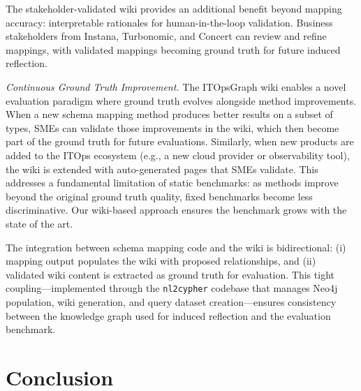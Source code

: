 \documentclass[sigconf, nonacm]{acmart}
\newcommand{\deleted}[1]{\textcolor{red}{#1}}
\begin{document}

The stakeholder-validated wiki provides an additional benefit beyond mapping accuracy: interpretable rationales for human-in-the-loop validation. Business stakeholders from Instana, Turbonomic, and Concert can review and refine mappings, with validated mappings becoming ground truth for future induced reflection.

\textit{Continuous Ground Truth Improvement.} The ITOpsGraph wiki enables a novel evaluation paradigm where ground truth evolves alongside method improvements. When a new schema mapping method produces better results on a subset of types, SMEs can validate those improvements in the wiki, which then become part of the ground truth for future evaluations. Similarly, when new products are added to the ITOps ecosystem (e.g., a new cloud provider or observability tool), the wiki is extended with auto-generated pages that SMEs validate. This addresses a fundamental limitation of static benchmarks: as methods improve beyond the original ground truth quality, fixed benchmarks become less discriminative. Our wiki-based approach ensures the benchmark grows with the state of the art.

The integration between schema mapping code and the wiki is bidirectional: (i) mapping output populates the wiki with proposed relationships, and (ii) validated wiki content is extracted as ground truth for evaluation. This tight coupling—implemented through the \texttt{nl2cypher} codebase that manages Neo4j population, wiki generation, and query dataset creation—ensures consistency between the knowledge graph used for induced reflection and the evaluation benchmark.


\section{Conclusion}

\end{document}
